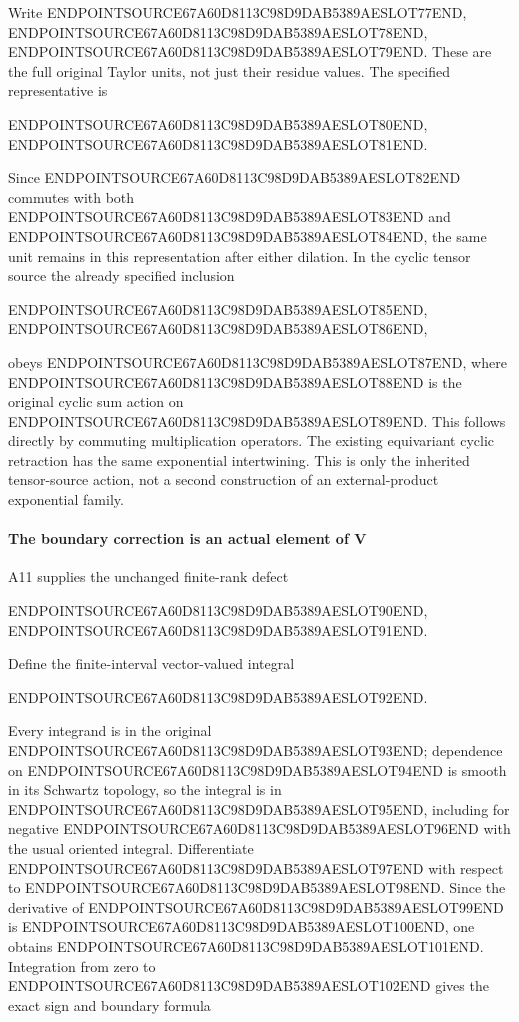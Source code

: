 Write ENDPOINTSOURCE67A60D8113C98D9DAB5389AESLOT77END, ENDPOINTSOURCE67A60D8113C98D9DAB5389AESLOT78END, ENDPOINTSOURCE67A60D8113C98D9DAB5389AESLOT79END. These are the full original Taylor units, not just their residue values. The specified representative is

ENDPOINTSOURCE67A60D8113C98D9DAB5389AESLOT80END, ENDPOINTSOURCE67A60D8113C98D9DAB5389AESLOT81END.

Since ENDPOINTSOURCE67A60D8113C98D9DAB5389AESLOT82END commutes with both ENDPOINTSOURCE67A60D8113C98D9DAB5389AESLOT83END and ENDPOINTSOURCE67A60D8113C98D9DAB5389AESLOT84END, the same unit remains in this representation after either dilation. In the cyclic tensor source the already specified inclusion

ENDPOINTSOURCE67A60D8113C98D9DAB5389AESLOT85END, ENDPOINTSOURCE67A60D8113C98D9DAB5389AESLOT86END,

obeys ENDPOINTSOURCE67A60D8113C98D9DAB5389AESLOT87END, where ENDPOINTSOURCE67A60D8113C98D9DAB5389AESLOT88END is the original cyclic sum action on ENDPOINTSOURCE67A60D8113C98D9DAB5389AESLOT89END. This follows directly by commuting multiplication operators. The existing equivariant cyclic retraction has the same exponential intertwining. This is only the inherited tensor-source action, not a second construction of an external-product exponential family.

\paragraph{The boundary correction is an actual element of V}\label{endpoint-f1_scaling--the-boundary-correction-is-an-actual-element-of-v}

A11 supplies the unchanged finite-rank defect

ENDPOINTSOURCE67A60D8113C98D9DAB5389AESLOT90END, ENDPOINTSOURCE67A60D8113C98D9DAB5389AESLOT91END.

Define the finite-interval vector-valued integral

ENDPOINTSOURCE67A60D8113C98D9DAB5389AESLOT92END.

Every integrand is in the original ENDPOINTSOURCE67A60D8113C98D9DAB5389AESLOT93END; dependence on ENDPOINTSOURCE67A60D8113C98D9DAB5389AESLOT94END is smooth in its Schwartz topology, so the integral is in ENDPOINTSOURCE67A60D8113C98D9DAB5389AESLOT95END, including for negative ENDPOINTSOURCE67A60D8113C98D9DAB5389AESLOT96END with the usual oriented integral. Differentiate ENDPOINTSOURCE67A60D8113C98D9DAB5389AESLOT97END with respect to ENDPOINTSOURCE67A60D8113C98D9DAB5389AESLOT98END. Since the derivative of ENDPOINTSOURCE67A60D8113C98D9DAB5389AESLOT99END is ENDPOINTSOURCE67A60D8113C98D9DAB5389AESLOT100END, one obtains ENDPOINTSOURCE67A60D8113C98D9DAB5389AESLOT101END. Integration from zero to ENDPOINTSOURCE67A60D8113C98D9DAB5389AESLOT102END gives the exact sign and boundary formula

